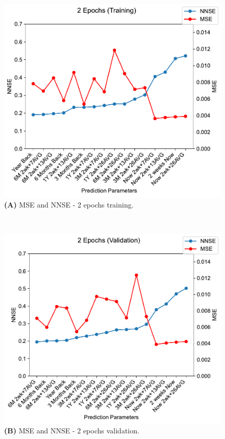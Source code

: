 \documentclass[utf8]{FrontiersinVancouver} %
\begin{document}
\begin{figure}[htb]

  \begin{center}

     \begin{minipage}[b]{0.45\textwidth}
       \includegraphics[width=1.0\linewidth]{images/2_training-MSE-and-NNSE.pdf}
        {\bf (A)} MSE and NNSE - 2 epochs training.
    \end{minipage}
     \ \
     \begin{minipage}[b]{0.45\textwidth}
        \includegraphics[width=1.0\linewidth]{images/2_validation-MSE-and-NNSE.pdf}
        {\bf (B)}  MSE and NNSE - 2 epochs validation.
     \end{minipage}


\end{center}
\end{figure}
\end{document}
